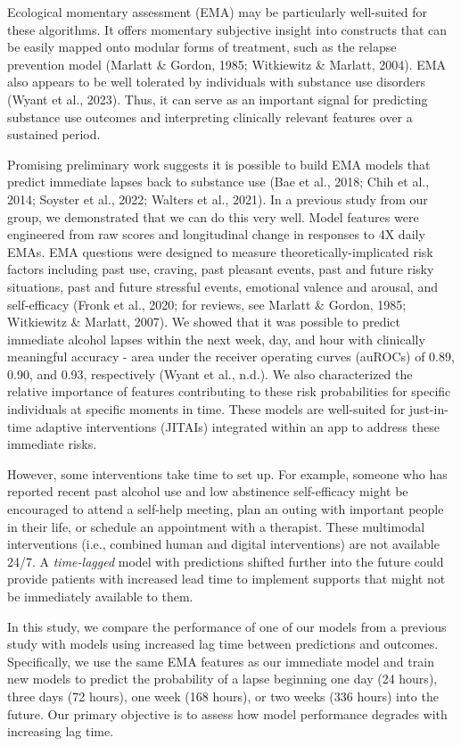 \documentclass[
]{agujournal2019}
\begin{document}
Ecological momentary assessment (EMA) may be particularly well-suited
for these algorithms. It offers momentary subjective insight into
constructs that can be easily mapped onto modular forms of treatment,
such as the relapse prevention model (Marlatt \& Gordon, 1985;
Witkiewitz \& Marlatt, 2004). EMA also appears to be well tolerated by
individuals with substance use disorders (Wyant et al., 2023). Thus, it
can serve as an important signal for predicting substance use outcomes
and interpreting clinically relevant features over a sustained period.

Promising preliminary work suggests it is possible to build EMA models
that predict immediate lapses back to substance use (Bae et al., 2018;
Chih et al., 2014; Soyster et al., 2022; Walters et al., 2021). In a
previous study from our group, we demonstrated that we can do this very
well. Model features were engineered from raw scores and longitudinal
change in responses to 4X daily EMAs. EMA questions were designed to
measure theoretically-implicated risk factors including past use,
craving, past pleasant events, past and future risky situations, past
and future stressful events, emotional valence and arousal, and
self-efficacy (Fronk et al., 2020; for reviews, see Marlatt \& Gordon,
1985; Witkiewitz \& Marlatt, 2007). We showed that it was possible to
predict immediate alcohol lapses within the next week, day, and hour
with clinically meaningful accuracy - area under the receiver operating
curves (auROCs) of 0.89, 0.90, and 0.93, respectively (Wyant et al.,
n.d.). We also characterized the relative importance of features
contributing to these risk probabilities for specific individuals at
specific moments in time. These models are well-suited for just-in-time
adaptive interventions (JITAIs) integrated within an app to address
these immediate risks.

However, some interventions take time to set up. For example, someone
who has reported recent past alcohol use and low abstinence
self-efficacy might be encouraged to attend a self-help meeting, plan an
outing with important people in their life, or schedule an appointment
with a therapist. These multimodal interventions (i.e., combined human
and digital interventions) are not available 24/7. A \emph{time-lagged}
model with predictions shifted further into the future could provide
patients with increased lead time to implement supports that might not
be immediately available to them.

In this study, we compare the performance of one of our models from a
previous study with models using increased lag time between predictions
and outcomes. Specifically, we use the same EMA features as our
immediate model and train new models to predict the probability of a
lapse beginning one day (24 hours), three days (72 hours), one week (168
hours), or two weeks (336 hours) into the future. Our primary objective
is to assess how model performance degrades with increasing lag time.
\end{document}
